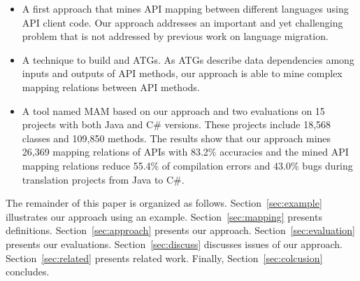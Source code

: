 \begin{itemize}\vspace*{-1.5ex}
\item A first approach that mines API mapping between
different languages using API client code. Our
approach addresses an important and yet challenging problem that is not
addressed by previous work on language migration.\vspace*{-1.5ex}
\item A technique to build and ATGs. As ATGs describe data dependencies among
inputs and outputs of API methods, our approach is able to mine
complex mapping relations between API methods.\vspace*{-1.5ex}
\item A tool named MAM based on our approach and two
evaluations on 15 projects with both Java and C\# versions. These
projects include 18,568 classes and 109,850 methods. The results
show that our approach mines 26,369 mapping relations of APIs with
83.2\% accuracies and the mined API mapping relations reduce 55.4\%
of compilation errors and 43.0\% bugs during translation projects
from Java to C\#.
\end{itemize}\vspace*{-1.5ex}

The remainder of this paper is organized as follows. Section~\ref{sec:example}
illustrates our approach using an example. Section~\ref{sec:mapping}
presents definitions. Section~\ref{sec:approach} presents our
approach. Section~\ref{sec:evaluation} presents our evaluations.
Section~\ref{sec:discuss} discusses issues of our approach.
Section~\ref{sec:related} presents related work. Finally,
Section~\ref{sec:colcusion} concludes.

